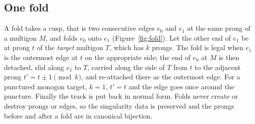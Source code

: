\documentclass[12pt]{amsart}
\theoremstyle{plain}
\theoremstyle{definition}
\begin{document}
\subsection{One fold}
\label{sec:onefold}
A fold takes a cusp, that is two consecutive edges $e_0$ and $e_1$ at the
same prong of a multigon $M$, and folds $e_0$ onto $e_1$
(Figure~\ref{fig:fold}).  Let the other end of $e_1$ be at prong $t$ of
the \emph{target} multigon $T$, which has $k$ prongs.  The fold is legal
when $e_1$ is the outermost edge at $t$ on the appropriate side; the end
of $e_0$ at $M$ is then detached, slid along $e_1$ to $T$, carried along
the side of $T$ from $t$ to the adjacent prong $t'=t\pm1 \pmod k$, and
re-attached there as the outermost edge.  For a punctured monogon target,
$k=1$, $t'=t$ and the edge goes once around the puncture.  Finally the
track is put back in normal form.  Folds never create or destroy prongs
or edges, so the singularity data is preserved and the prongs before and
after a fold are in canonical bijection.
\end{document}
